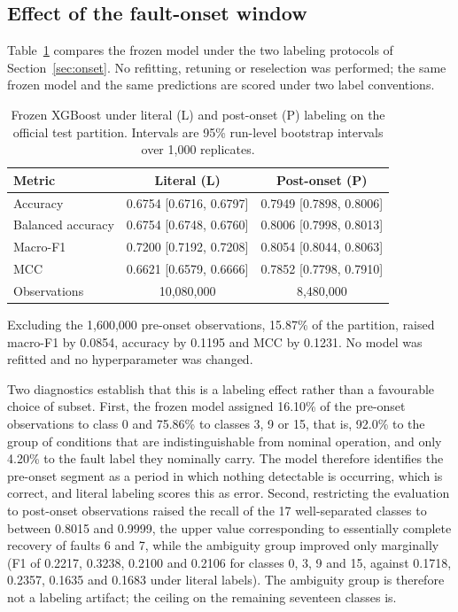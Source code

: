 \documentclass[12pt,a4paper]{article}
\begin{document}
\subsection{Effect of the fault-onset window}
\label{sec:onseteffect}

Table~\ref{tab:onset} compares the frozen model under the two labeling
protocols of Section~\ref{sec:onset}. No refitting, retuning or reselection was
performed; the same frozen model and the same predictions are scored under two
label conventions.

\begin{table}[t]
\centering
\caption{Frozen XGBoost under literal (L) and post-onset (P) labeling on the
official test partition. Intervals are 95\% run-level bootstrap intervals over
1,000 replicates.}
\label{tab:onset}
\small
\begin{tabular}{lcc}
\toprule
Metric & Literal (L) & Post-onset (P)\\
\midrule
Accuracy          & 0.6754 [0.6716, 0.6797] & 0.7949 [0.7898, 0.8006]\\
Balanced accuracy & 0.6754 [0.6748, 0.6760] & 0.8006 [0.7998, 0.8013]\\
Macro-F1          & 0.7200 [0.7192, 0.7208] & 0.8054 [0.8044, 0.8063]\\
MCC               & 0.6621 [0.6579, 0.6666] & 0.7852 [0.7798, 0.7910]\\
Observations      & 10,080,000 & 8,480,000\\
\bottomrule
\end{tabular}
\end{table}

Excluding the 1,600,000 pre-onset observations, 15.87\% of the partition,
raised macro-F1 by 0.0854, accuracy by 0.1195 and MCC by 0.1231. No model was
refitted and no hyperparameter was changed.

Two diagnostics establish that this is a labeling effect rather than a
favourable choice of subset. First, the frozen model assigned 16.10\% of the
pre-onset observations to class 0 and 75.86\% to classes 3, 9 or 15, that is,
92.0\% to the group of conditions that are indistinguishable from nominal
operation, and only 4.20\% to the fault label they nominally carry. The model
therefore identifies the pre-onset segment as a period in which nothing
detectable is occurring, which is correct, and literal labeling scores this as
error. Second, restricting the evaluation to post-onset observations raised the
recall of the 17 well-separated classes to between 0.8015 and 0.9999, the upper
value corresponding to essentially complete recovery of faults 6 and 7, while
the ambiguity group improved only marginally (F1 of 0.2217, 0.3238, 0.2100 and
0.2106 for classes 0, 3, 9 and 15, against 0.1718, 0.2357, 0.1635 and 0.1683
under literal labels). The ambiguity group is therefore not a labeling
artifact; the ceiling on the remaining seventeen classes is.
\end{document}
